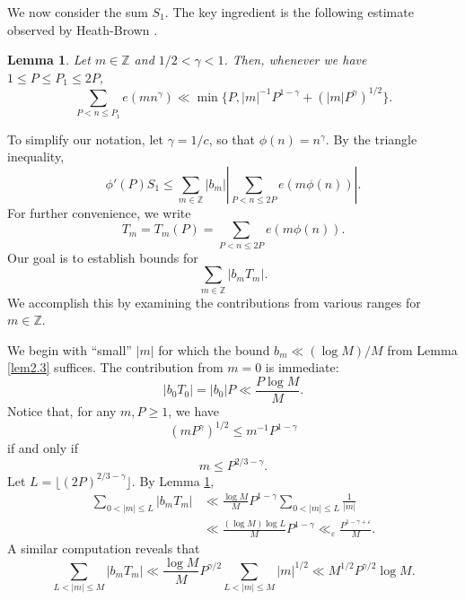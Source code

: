 \documentclass[12pt, reqno]{amsart}
\newtheorem{lemma}[thm]{Lemma}
\theoremstyle{definition}
\theoremstyle{remark}
\numberwithin{equation}{section}
\theoremstyle{definition}
\def\gam{{\gamma}} \def\Gam{{\Gamma}}
\def\eps{\varepsilon}
\def\le{\leqslant} \def\ge{\geqslant} \def\pleq{\preccurlyeq} \def\ple{\prec}
\def \bZ {\mathbb Z}
\begin{document}
We now consider the sum $S_1$. The key ingredient is the following estimate observed by Heath-Brown \cite[Lemma 1]{HB1983}.

\begin{lemma}
\label{lem2.4}
Let $m \in \bZ$ and $1/2 < \gam < 1$. Then, whenever we have $1 \le P \le P_1 \le 2P$, 
\begin{equation*}
\sum_{P < n \le P_1} e(m n^\gamma) \ll \min\{P, |m|^{-1} P^{1-\gamma} + (|m| P^\gamma)^{1/2}
\}.
\end{equation*}
\end{lemma}

To simplify our notation, let $\gamma = 1/c$, so that $\phi(n) = n^\gamma$. By the triangle inequality,
\begin{equation*}
\phi'(P) S_1 \le \sum_{m\in \bZ} |b_{m}|\left| \sum_{P < n \le 2P} e(m\phi(n)) \right|.
\end{equation*}
For further convenience, we write
\begin{equation*}
T_m = T_m(P) = \sum_{P < n \le 2P} e(m\phi(n)).
\end{equation*}
Our goal is to establish bounds for
\begin{equation*}
\sum_{m\in\bZ}|b_mT_m|.
\end{equation*}
We accomplish this by examining the contributions from various ranges for $m\in\bZ$. 

We begin with ``small'' $|m|$ for which the bound $b_m \ll (\log M)/M$ from Lemma \ref{lem2.3} suffices. The contribution from $m=0$ is immediate:
\begin{equation*}
|b_0 T_0| = |b_0|P\ll \frac{P\log M}{M}.
\end{equation*}
Notice that, for any $m,P \ge 1$, we have
\begin{equation*}
(m P^\gamma)^{1/2} \le m^{-1} P^{1-\gamma} 
\end{equation*}
if and only if
\begin{equation*}
m \leqslant P^{2/3 - \gamma}.
\end{equation*}
Let $L = \lfloor (2P)^{2/3 - \gamma}\rfloor$. By Lemma \ref{lem2.4},
\begin{align*}
\sum_{0<|m|\le L} |b_mT_m| &\ll \frac{\log M}{M} P^{1-\gamma} \sum_{0<|m|\le L} \frac{1}{|m|} \\ &\ll \frac{(\log M)\log L}{M} P^{1-\gamma} \ll_\eps \frac{P^{1-\gamma + \eps}}{M}.
\end{align*}
A similar computation reveals that
\begin{equation*}
\sum_{L<|m|\le M}|b_m T_m| \ll \frac{\log M}{M} P^{\gamma/2} \sum_{L<|m|\le M} |m|^{1/2} \ll M^{1/2} P^{\gamma/2} \log M.
\end{equation*}
\end{document}
